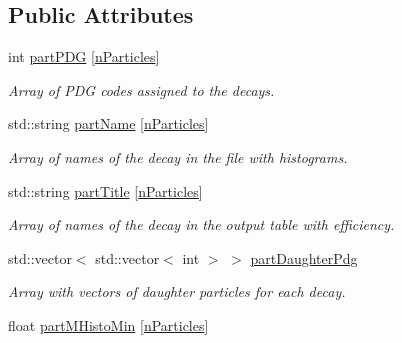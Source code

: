 \subsection*{Public Attributes}
\begin{DoxyCompactItemize}
\item 
int \hyperlink{classKFPartEfficiencies_a1e94d7125c8ee9f06cbfd81ff9cf3ffe}{part\+P\+DG} \mbox{[}\hyperlink{classKFPartEfficiencies_a229165eeecbc664b7723d3ce588783e8}{n\+Particles}\mbox{]}\hypertarget{classKFPartEfficiencies_a1e94d7125c8ee9f06cbfd81ff9cf3ffe}{}\label{classKFPartEfficiencies_a1e94d7125c8ee9f06cbfd81ff9cf3ffe}

\begin{DoxyCompactList}\small\item\em Array of P\+DG codes assigned to the decays. \end{DoxyCompactList}\item 
std\+::string \hyperlink{classKFPartEfficiencies_a93c53aece9a458b82f3a87a1b2dfc386}{part\+Name} \mbox{[}\hyperlink{classKFPartEfficiencies_a229165eeecbc664b7723d3ce588783e8}{n\+Particles}\mbox{]}\hypertarget{classKFPartEfficiencies_a93c53aece9a458b82f3a87a1b2dfc386}{}\label{classKFPartEfficiencies_a93c53aece9a458b82f3a87a1b2dfc386}

\begin{DoxyCompactList}\small\item\em Array of names of the decay in the file with histograms. \end{DoxyCompactList}\item 
std\+::string \hyperlink{classKFPartEfficiencies_ae325b82a6db6f38f7a37af090c9ffc09}{part\+Title} \mbox{[}\hyperlink{classKFPartEfficiencies_a229165eeecbc664b7723d3ce588783e8}{n\+Particles}\mbox{]}\hypertarget{classKFPartEfficiencies_ae325b82a6db6f38f7a37af090c9ffc09}{}\label{classKFPartEfficiencies_ae325b82a6db6f38f7a37af090c9ffc09}

\begin{DoxyCompactList}\small\item\em Array of names of the decay in the output table with efficiency. \end{DoxyCompactList}\item 
std\+::vector$<$ std\+::vector$<$ int $>$ $>$ \hyperlink{classKFPartEfficiencies_abd5490c443f3a36eeff06523e04a2e8b}{part\+Daughter\+Pdg}\hypertarget{classKFPartEfficiencies_abd5490c443f3a36eeff06523e04a2e8b}{}\label{classKFPartEfficiencies_abd5490c443f3a36eeff06523e04a2e8b}

\begin{DoxyCompactList}\small\item\em Array with vectors of daughter particles for each decay. \end{DoxyCompactList}\item 
float \hyperlink{classKFPartEfficiencies_a48950848b5b2c8990a30d4dc58f2f0ec}{part\+M\+Histo\+Min} \mbox{[}\hyperlink{classKFPartEfficiencies_a229165eeecbc664b7723d3ce588783e8}{n\+Particles}\mbox{]}\hypertarget{classKFPartEfficiencies_a48950848b5b2c8990a30d4dc58f2f0ec}{}\label{classKFPartEfficiencies_a48950848b5b2c8990a30d4dc58f2f0ec}


\end{DoxyCompactItemize}
